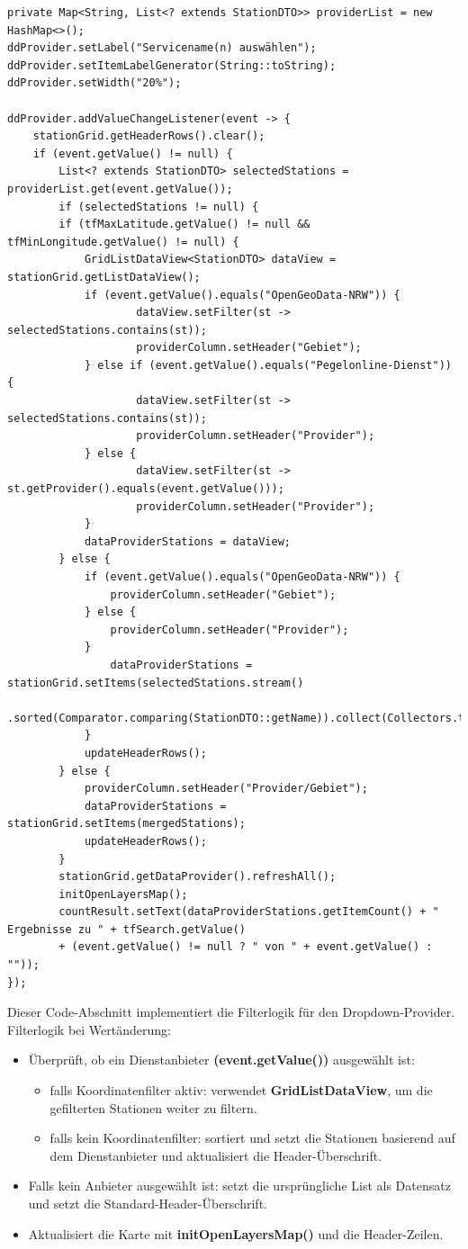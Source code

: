 \documentclass[a4paper,12pt]{scrreprt}
\begin{document}
\begin{lstlisting}
private Map<String, List<? extends StationDTO>> providerList = new HashMap<>();
ddProvider.setLabel("Servicename(n) auswählen");
ddProvider.setItemLabelGenerator(String::toString);
ddProvider.setWidth("20%");
	
ddProvider.addValueChangeListener(event -> {
	stationGrid.getHeaderRows().clear();
	if (event.getValue() != null) {
		List<? extends StationDTO> selectedStations = providerList.get(event.getValue());
		if (selectedStations != null) {
		if (tfMaxLatitude.getValue() != null && tfMinLongitude.getValue() != null) {
			GridListDataView<StationDTO> dataView = stationGrid.getListDataView();
			if (event.getValue().equals("OpenGeoData-NRW")) {
					dataView.setFilter(st -> selectedStations.contains(st));
					providerColumn.setHeader("Gebiet");
			} else if (event.getValue().equals("Pegelonline-Dienst")) {
					dataView.setFilter(st -> selectedStations.contains(st));
					providerColumn.setHeader("Provider");
			} else {
					dataView.setFilter(st -> st.getProvider().equals(event.getValue()));
					providerColumn.setHeader("Provider");
			}
			dataProviderStations = dataView;
		} else {
			if (event.getValue().equals("OpenGeoData-NRW")) {
				providerColumn.setHeader("Gebiet");
			} else {
				providerColumn.setHeader("Provider");
			}
				dataProviderStations = stationGrid.setItems(selectedStations.stream()
				.sorted(Comparator.comparing(StationDTO::getName)).collect(Collectors.toList()));
			}
			updateHeaderRows();
		} else {
			providerColumn.setHeader("Provider/Gebiet");
			dataProviderStations = stationGrid.setItems(mergedStations);
			updateHeaderRows();
		}
		stationGrid.getDataProvider().refreshAll();
		initOpenLayersMap();
		countResult.setText(dataProviderStations.getItemCount() + " Ergebnisse zu " + tfSearch.getValue()
		+ (event.getValue() != null ? " von " + event.getValue() : ""));
});
\end{lstlisting}
Dieser Code-Abschnitt implementiert die Filterlogik für den Dropdown-Provider.\\
Filterlogik bei Wertänderung:
\begin{itemize}
	\item Überprüft, ob ein Dienstanbieter \textbf{(event.getValue())} ausgewählt ist:
	\begin{itemize}
		\item falls Koordinatenfilter aktiv: verwendet \textbf{GridListDataView}, um die gefilterten Stationen weiter zu filtern.
		\item falls kein Koordinatenfilter: sortiert und setzt die Stationen basierend auf dem Dienstanbieter und aktualisiert die Header-Überschrift.
	\end{itemize}
	\item Falls kein Anbieter ausgewählt ist: setzt die ursprüngliche List als Datensatz und setzt die Standard-Header-Überschrift.
	\item Aktualisiert die Karte mit \textbf{initOpenLayersMap()} und die Header-Zeilen. 
\end{itemize}
\end{document}
